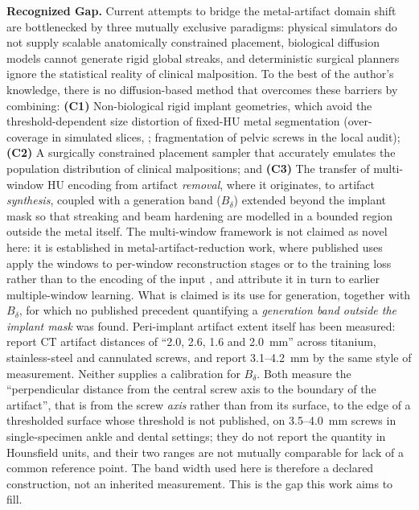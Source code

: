 \documentclass[9pt]{extarticle}
\begin{document}
\textbf{Recognized Gap.} Current attempts to bridge the metal-artifact domain shift are bottlenecked by three mutually exclusive paradigms: physical simulators do not supply scalable anatomically constrained placement, biological diffusion models cannot generate rigid global streaks, and deterministic surgical planners ignore the statistical reality of clinical malposition. To the best of the author's knowledge, there is no diffusion-based method that overcomes these barriers by combining: \textbf{(C1)} Non-biological rigid implant geometries, which avoid the threshold-dependent size distortion of fixed-HU metal segmentation (over-coverage in simulated slices, \citealp{xie2024implantsegmentation}; fragmentation of pelvic screws in the local audit); \textbf{(C2)} A surgically constrained placement sampler that accurately emulates the population distribution of clinical malpositions; and \textbf{(C3)} The transfer of multi-window HU encoding from artifact \emph{removal}, where it originates, to artifact \emph{synthesis}, coupled with a generation band ($B_{\delta}$) extended beyond the implant mask so that streaking and beam hardening are modelled in a bounded region outside the metal itself. The multi-window framework is not claimed as novel here: it is established in metal-artifact-reduction work, where published uses apply the windows to per-window reconstruction stages or to the training loss rather than to the encoding of the input \citep{wang2025adaptiveweighting,li2024}, and \citet{wang2025adaptiveweighting} attribute it in turn to earlier multiple-window learning. What is claimed is its use for generation, together with $B_{\delta}$, for which no published precedent quantifying a \emph{generation band outside the implant mask} was found. Peri-implant artifact extent itself has been measured: \citet{radzi2014metalartifacts} report CT artifact distances of ``2.0, 2.6, 1.6 and 2.0~mm'' across titanium, stainless-steel and cannulated screws, and \citet{cassanego2026evolution} report 3.1--4.2~mm by the same style of measurement. Neither supplies a calibration for $B_{\delta}$. Both measure the ``perpendicular distance from the central screw axis to the boundary of the artifact'', that is from the screw \emph{axis} rather than from its surface, to the edge of a thresholded surface whose threshold is not published, on 3.5--4.0~mm screws in single-specimen ankle and dental settings; they do not report the quantity in Hounsfield units, and their two ranges are not mutually comparable for lack of a common reference point. The band width used here is therefore a declared construction, not an inherited measurement. This is the gap this work aims to fill.
\end{document}
